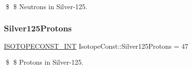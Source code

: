 \$ \$ Neutrons in Silver-\/125. \mbox{\label{group___isotope_const-_silver-_ag125_ga5db6bbf17208284d59b22885547d3dc4}} 
\subsubsection{\texorpdfstring{Silver125\+Protons}{Silver125Protons}}
{\footnotesize\ttfamily \mbox{\hyperlink{group___isotope_const-_macros_ga5f18360b3e99483a35c32d789e62621c}{I\+S\+O\+T\+O\+P\+E\+C\+O\+N\+S\+T\+\_\+\+I\+NT}} Isotope\+Const\+::\+Silver125\+Protons = 47}

\$ \$ Protons in Silver-\/125. 